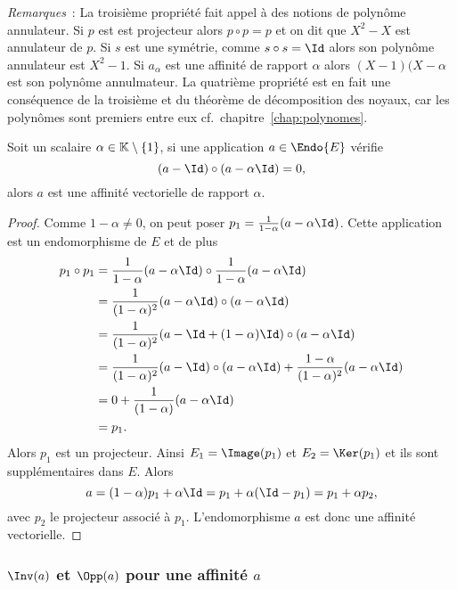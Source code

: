 \emph{Remarques}~: La troisième propriété fait appel à des notions de polynôme annulateur. Si $p$ est est projecteur alors $p \circ p=p$ et on dit que $X^2-X$ est annulateur de $p$. Si $s$ est une symétrie, comme $s \circ s =\Id$ alors son polynôme annulateur est $X^2-1$. Si $a_\alpha$ est une affinité de rapport $\alpha$ alors $(X-1)(X-\alpha$ est son polynôme annulmateur. La quatrième propriété est en fait une conséquence de la troisième et du théorème de décomposition des noyaux, car les polynômes sont premiers entre eux cf.\ chapitre~\ref{chap:polynomes}.

\begin{prop}
  Soit un scalaire $\alpha \in \mathbb{K}\setminus\{1\}$, si une application $a \in \Endo{E}$ vérifie
  \begin{equation}
    (a-\Id)\circ (a-\alpha \Id)=0,
  \end{equation}
  alors $a$ est une affinité vectorielle de rapport $\alpha$.
\end{prop}
\begin{proof}
  Comme $1-\alpha\neq 0$, on peut poser $p_1=\frac{1}{1-\alpha} (a-\alpha\Id)$. Cette application est un endomorphisme de $E$ et de plus
  \begin{align}
    p_1 \circ p_1 &= \frac{1}{1-\alpha} (a-\alpha\Id) \circ \frac{1}{1-\alpha} (a-\alpha\Id) \\
    &=\frac{1}{(1-\alpha)^2} (a-\alpha\Id) \circ (a-\alpha\Id) \\
    &=\frac{1}{(1-\alpha)^2} (a-\Id +(1-\alpha)\Id) \circ (a-\alpha\Id) \\
    &=\frac{1}{(1-\alpha)^2} (a-\Id) \circ (a-\alpha\Id) + \frac{1-\alpha}{(1-\alpha)^2}(a-\alpha\Id) \\
    &= 0 + \frac{1}{(1-\alpha)}(a-\alpha\Id)\\
    &=p_1.
  \end{align}
  Alors $p_1$ est un projecteur. Ainsi $E_1=\Image(p_1)$ et $E_2=\Ker(p_1)$ et ils sont supplémentaires dans $E$. Alors
  \begin{equation}
    a=(1-\alpha)p_1 +\alpha \Id = p_1 +\alpha(\Id-p_1) = p_1+\alpha p_2,
  \end{equation}
  avec $p_2$ le projecteur associé à $p_1$. L'endomorphisme $a$ est donc une affinité vectorielle.
\end{proof}

\subsubsection{$\Inv(a)$ et $\Opp(a)$ pour une affinité $a$}

